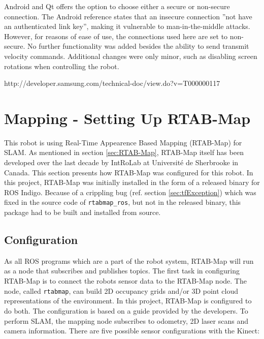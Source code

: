 Android and Qt offers the option to choose either a secure or non-secure connection. The Android reference states that an insecure connection ''not have an authenticated link key''\cite{android_bt_reference}, making it vulnerable to man-in-the-middle attacks. However, for reasons of ease of use, the connections used here are set to non-secure. No further functionality was added besides the ability to send transmit velocity commands. Additional changes were only minor, such as disabling screen rotations when controlling the robot. 

http://developer.samsung.com/technical-doc/view.do?v=T000000117



\section{Mapping - Setting Up RTAB-Map}
\label{sec:mapping}
This robot is using Real-Time Appearence Based Mapping (\ac{RTAB-Map}) for \ac{SLAM}. As mentioned in section \ref{sec:RTAB-Map}, \ac{RTAB-Map} itself has been developed over the last decade by IntRoLab at Université de Sherbrooke in Canada. This section presents how \ac{RTAB-Map} was configured for this robot. In this project, \ac{RTAB-Map} was initially installed in the form of a released binary for \ac{ROS} Indigo. Because of a crippling bug (ref. section \ref{sec:tfException}) which was fixed in the source code
of \texttt{rtabmap\_ros}, but not in the released binary, this package had to be built and installed from source.

\subsection{Configuration}
\label{sec:configuration}
As all \ac{ROS} programs which are a part of the robot system, \ac{RTAB-Map} will run as a node that subscribes and publishes topics. The first task in configuring \ac{RTAB-Map} is to connect the robots sensor data to the \ac{RTAB-Map} node. The node, called \texttt{rtabmap}, can build 2D occupancy grids and/or 3D point cloud representations of the environment. In this project, \ac{RTAB-Map} is configured to do both. The configuration is based on a guide\cite{rtabmap_setup} provided by the developers. To perform \ac{SLAM}, the mapping node subscribes to odometry, 2D laser scans and camera information. There are five possible sensor configurations with the Kinect\cite{rtabmap_setup}:

